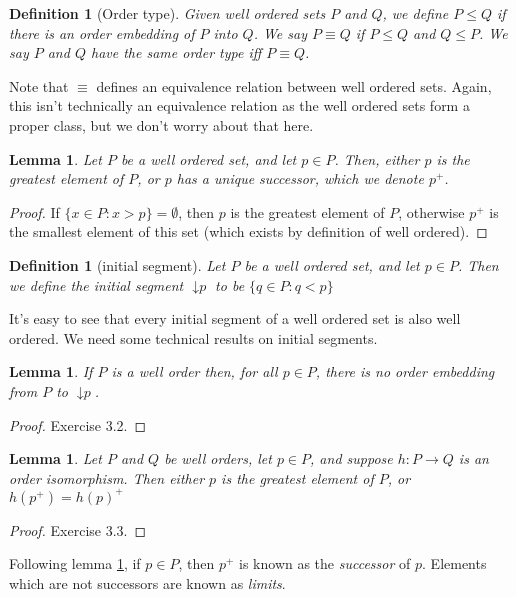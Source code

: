 \documentclass{article}
\theoremstyle{plain}
\newtheorem{definition}[theorem]{Definition}{\bfseries}{\upshape}
\newtheorem{lemma}[theorem]{Lemma}{\bfseries}{\upshape}
\DeclareMathOperator{\ISp}{\downarrow \mathit{p}}
\begin{document}
\begin{definition}[Order type]
Given well ordered sets $P$ and $Q$, we define $P\leq Q$ if there is an order embedding of $P$ into $Q$. We say $P \equiv Q$ if $P\leq Q$ and $Q\leq P$. We say $P$ and $Q$ have the same \emph{order type} iff $P\equiv Q$.
\end{definition}

Note that $\equiv$ defines an equivalence relation between well ordered sets. Again, this isn't technically an equivalence relation as the well ordered sets form a proper class, but we don't worry about that here. 

\begin{lemma}\label{L:C3succ}
Let $P$ be a well ordered set, and let $p\in P$. Then, either $p$ is the greatest element of $P$, or $p$ has a unique successor, which we denote $p^+$. 
\end{lemma}
\begin{proof}
If $\{x\in P: x > p\}=\emptyset$, then $p$ is the greatest element of $P$, otherwise $p^+$ is the smallest element of this set (which exists by definition of well ordered). 
\end{proof}

\begin{definition}[initial segment]
Let $P$ be a well ordered set, and let $p\in P$. Then we define the \emph{initial segment} $\ISp$ to be $\{q\in P: q<p\}$ 
\end{definition}

It's easy to see that every initial segment of a well ordered set is also well ordered. We need some technical results on initial segments.

\begin{lemma}\label{L:init}
If $P$ is a well order then, for all $p\in P$, there is no order embedding from $P$ to $\ISp$.
\end{lemma}
\begin{proof}
Exercise 3.2.
\end{proof}

\begin{lemma}\label{L:successor}
Let $P$ and $Q$ be well orders, let $p\in P$, and suppose $h:P\to Q$ is an order isomorphism. Then either $p$ is the greatest element of $P$, or $h(p^+)=h(p)^+$
\end{lemma}
\begin{proof}
Exercise 3.3.
\end{proof}

Following lemma \ref{L:C3succ}, if $p\in P$, then $p^+$ is known as the \emph{successor} of $p$. Elements which are not successors are known as \emph{limits}.
\end{document}
